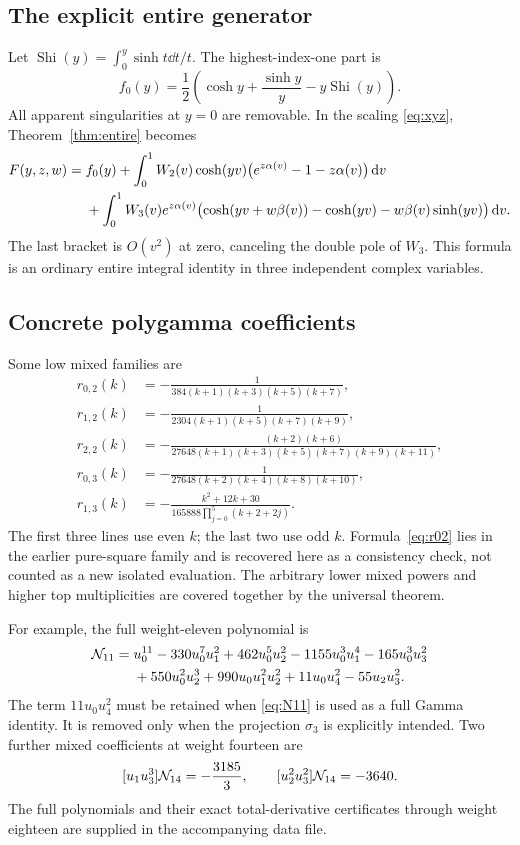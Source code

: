 \documentclass[11pt,letterpaper]{article}
\numberwithin{equation}{section}
\theoremstyle{plain}
\theoremstyle{definition}
\theoremstyle{remark}
\DeclareMathOperator{\Shi}{Shi}\DeclareMathOperator{\RePart}{Re}
\begin{document}
\subsection{The explicit entire generator}

Let $\Shi(y)=\int_0^y\sinh t\dd t/t$. The highest-index-one part is
\begin{equation}\label{eq:f0}
 f_0(y)=\frac12\left(\cosh y+\frac{\sinh y}{y}-y\Shi(y)\right).
\end{equation}
All apparent singularities at $y=0$ are removable. In the scaling \eqref{eq:xyz}, Theorem~\ref{thm:entire} becomes
\begin{align}
 F(y,z,w)={}&f_0(y)
 +\int_0^1W_2(v)\cosh(yv)
       \bigl(e^{z\alpha(v)}-1-z\alpha(v)\bigr)\,\mathrm d v\notag\\
 &+\int_0^1W_3(v)e^{z\alpha(v)}
 \bigl(\cosh(yv+w\beta(v))-\cosh(yv)
                 -w\beta(v)\sinh(yv)\bigr)\,\mathrm d v.\label{eq:four-entire}
\end{align}
The last bracket is $O(v^2)$ at zero, canceling the double pole of $W_3$. This formula is an ordinary entire integral identity in three independent complex variables.

\subsection{Concrete polygamma coefficients}

Some low mixed families are
\begin{align}
 r_{0,2}(k)&=-\frac1{384(k+1)(k+3)(k+5)(k+7)},\label{eq:r02}\\
 r_{1,2}(k)&=-\frac1{2304(k+1)(k+5)(k+7)(k+9)},\label{eq:r12}\\
 r_{2,2}(k)&=-\frac{(k+2)(k+6)}
 {27648(k+1)(k+3)(k+5)(k+7)(k+9)(k+11)},\label{eq:r22}\\
 r_{0,3}(k)&=-\frac1{27648(k+2)(k+4)(k+8)(k+10)},\label{eq:r03}\\
 r_{1,3}(k)&=-\frac{k^2+12k+30}
 {165888\prod_{j=0}^{5}(k+2+2j)}.\label{eq:r13}
\end{align}
The first three lines use even $k$; the last two use odd $k$. Formula~\eqref{eq:r02} lies in the earlier pure-square family and is recovered here as a consistency check, not counted as a new isolated evaluation. The arbitrary lower mixed powers and higher top multiplicities are covered together by the universal theorem.

For example, the full weight-eleven polynomial is
\begin{align}
 \mathcal N_{11}={}&u_0^{11}-330u_0^7u_1^2+462u_0^5u_2^2
             -1155u_0^3u_1^4-165u_0^3u_3^2\notag\\
 &+550u_0^2u_2^3+990u_0u_1^2u_2^2
             +11u_0u_4^2-55u_2u_3^2.\label{eq:N11}
\end{align}
The term $11u_0u_4^2$ must be retained when \eqref{eq:N11} is used as a full Gamma identity. It is removed only when the projection $\sigma_3$ is explicitly intended. Two further mixed coefficients at weight fourteen are
\[
 [u_1u_3^3]\mathcal N_{14}=-\frac{3185}{3},\qquad
 [u_2^2u_3^2]\mathcal N_{14}=-3640.
\]
The full polynomials and their exact total-derivative certificates through weight eighteen are supplied in the accompanying data file.
\end{document}
